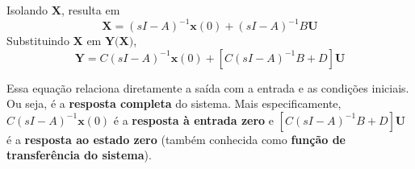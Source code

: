 \documentclass{article}
\numberwithin{equation}{section}
\begin{document}
\noindent Isolando $\textbf{X}$, resulta em
\begin{equation*}
    \textbf{X}=(sI-A)^{-1}\textbf{x}(0)+(sI-A)^{-1}B\textbf{U}
\end{equation*}
Substituindo $\textbf{X}$ em $\textbf{Y(X)}$,
\begin{equation}
    \textbf{Y}=C(sI-A)^{-1}\textbf{x}(0)+[C(sI-A)^{-1}B + D]\textbf{U}
\end{equation}

Essa equação relaciona diretamente a saída com a entrada e as condições iniciais. Ou seja, é a \textbf{resposta completa} do sistema. Mais especificamente, $C(sI-A)^{-1}\textbf{x}(0)$ é a \textbf{resposta à entrada zero} e $[C(sI-A)^{-1}B+D]\textbf{U}$ é a \textbf{resposta ao estado zero} (também conhecida como \textbf{função de transferência do sistema}).
\end{document}
